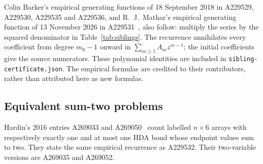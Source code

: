 \documentclass[11pt,a4paper]{article}
\begin{document}
Colin Barker's empirical generating functions of 18 September 2018 in
A229529, A229530, A229535 and A229536, and R.\ J.\ Mathar's empirical
generating function of 13 November 2026 in A229531~\cite{siblings},
also follow: multiply the series by the squared denominator in
Table~\ref{tab:siblings}. The recurrence annihilates every coefficient
from degree $m_0-1$ onward in $\sum_{m\geq1}A_mz^{m-1}$;
the initial coefficients give the source numerators. These polynomial
identities are included in \texttt{sibling-certificate.json}.
The empirical formulas are credited to their contributors, rather than
attributed here as new formulas.

\subsection{Equivalent sum-two problems}

Hardin's 2016 entries A269033 and A269050~\cite{sum-two} count labelled
$n\times6$ arrays with respectively exactly one and at most one HDA
bond whose endpoint values sum to two. They state the same empirical
recurrence as A229532. Their two-variable versions are A269035 and A269052.
\end{document}
